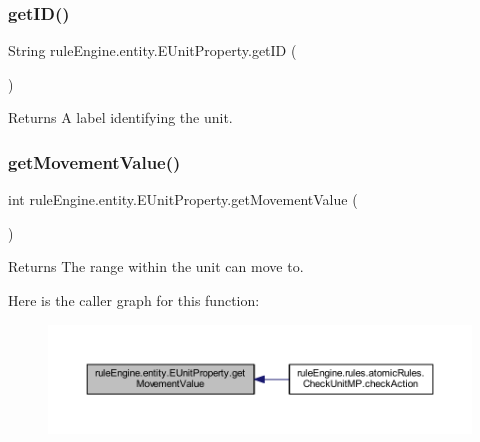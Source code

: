 \subsubsection{\texorpdfstring{get\+I\+D()}{getID()}}
{\footnotesize\ttfamily String rule\+Engine.\+entity.\+E\+Unit\+Property.\+get\+ID (\begin{DoxyParamCaption}{ }\end{DoxyParamCaption})\hspace{0.3cm}{\ttfamily [inline]}}

\begin{DoxyReturn}{Returns}
A label identifying the unit. 
\end{DoxyReturn}
\mbox{\label{enumrule_engine_1_1entity_1_1_e_unit_property_a8ce053c172aa6ffc4132feb87b6a855a}} 
\subsubsection{\texorpdfstring{get\+Movement\+Value()}{getMovementValue()}}
{\footnotesize\ttfamily int rule\+Engine.\+entity.\+E\+Unit\+Property.\+get\+Movement\+Value (\begin{DoxyParamCaption}{ }\end{DoxyParamCaption})\hspace{0.3cm}{\ttfamily [inline]}}

\begin{DoxyReturn}{Returns}
The range within the unit can move to. 
\end{DoxyReturn}
Here is the caller graph for this function\+:
\nopagebreak
\begin{figure}[H]
\begin{center}
\leavevmode
\includegraphics[width=350pt]{enumrule_engine_1_1entity_1_1_e_unit_property_a8ce053c172aa6ffc4132feb87b6a855a_icgraph}
\end{center}
\end{figure}
\mbox{\label{enumrule_engine_1_1entity_1_1_e_unit_property_a90937a24e0b60b82124f8d1a1a5b7073}} 
